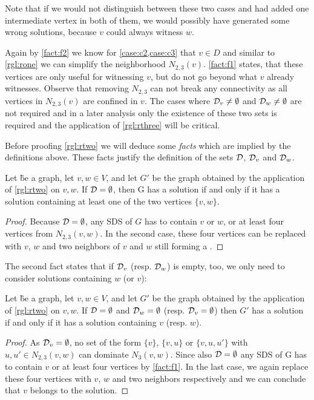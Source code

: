 Note that if we would not distinguish between these two cases and had added one intermediate vertex in both of them, we would possibly have generated some wrong solutions, because $v$ could always witness $w$.


Again by \cref{fact:f2} we know for \cref{case:c2,case:c3} that $v \in D$ and similar to \cref{rgl:rone} we can simplify the neighborhood $N_{2,3}(v)$. \cref{fact:f1} states, that these vertices are only useful for witnessing $v$, but do not go beyond what $v$ already witnesses. Observe that removing $N_{2,3}$ can not break any connectivity as all vertices in  $N_{2,3}(v)$ are confined in $v$. The cases where $\mathcal{D}_{v} \neq \emptyset$ and $\mathcal{D}_{w} \neq \emptyset$ are not required and in a later analysis only the existence of these two sets is required and the application of \cref{rgl:rthree} will be critical.

Before proofing \cref{rgl:rtwo} we will deduce some \textit{facts} which are implied by the definitions above. These facts justify the definition of the sets $\mathcal{D}$, $\mathcal{D}_{v}$ and $\mathcal{D}_{w}$.

\begin{fact}\label{fact:f1}
    Let \G be a graph, let $v,w \in V$, and let $G'$ be the graph obtained by the application of \cref{rgl:rtwo} on $v,w$. If $\mathcal{D} = \emptyset$, then G has a solution if and only if it has a solution containing at least one of the two vertices $\{v,w \}$.
\end{fact}
\begin{proof}
Because $\mathcal{D} = \emptyset$, any SDS of $G$ has to contain $v$ or $w$, or at least four vertices from $N_{2,3}(v,w)$. In the second case, these four vertices can be replaced with $v$, $w$ and two neighbors of $v$ and $w$ still forming a \sdom.
\end{proof}

The second fact states that if  $\mathcal{D}_{v}$ (resp. $\mathcal{D}_{w}$) is empty, too, we only need to consider solutions containing $w$ (or $v$):

\begin{fact}\label{fact:f2}
    Let \G be a graph, let $v,w \in V$, and let $G'$ be the graph obtained by the application of \cref{rgl:rtwo} on $v, w$. If $\mathcal{D} = \emptyset$ and $\mathcal{D}_{w} = \emptyset$ (resp. $\mathcal{D}_{v} = \emptyset$) then $G'$ has a solution if and only if it has a solution containing $v$ (resp. $w$).
\end{fact}
\begin{proof}
As $\mathcal{D}_{v} = \emptyset$, no set of the form $\{v\}$, $\{v, u\}$ or $\{v, u, u'\}$ with $u, u' \in N_{2,3}(v,w)$ can dominate $N_3(v,w)$. Since also $\mathcal{D} = \emptyset$ any SDS of G has to contain $v$ or at least four vertices by \cref{fact:f1}. In the last case, we again replace these four vertices with $v$, $w$ and two neighbors respectively and we can conclude that $v$ belongs to the solution.
\end{proof}

